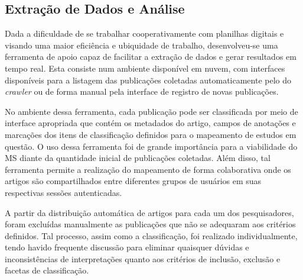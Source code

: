 \subsection{Extração de Dados e Análise}

Dada a dificuldade de se trabalhar cooperativamente com planilhas digitais e visando uma maior eficiência e ubiquidade de trabalho, desenvolveu-se uma ferramenta de apoio capaz de facilitar a extração de dados e gerar resultados em tempo real. Esta consiste num ambiente disponível em nuvem, com interfaces disponíveis para a listagem das publicações coletadas automaticamente pelo do \emph{crawler} ou de forma manual pela interface de registro de novas publicações.

No ambiente dessa ferramenta, cada publicação pode ser classificada por meio de interface apropriada que contém os metadados do artigo, campos de anotações e marcações dos itens de classificação definidos para o mapeamento de estudos em questão. O uso dessa ferramenta foi de grande importância para a viabilidade do MS diante da quantidade inicial de publicações coletadas. Al\'{e}m disso, tal ferramenta permite a realiza\c{c}\~{a}o do mapeamento de forma colaborativa onde os artigos s\~{a}o compartilhados entre diferentes grupos de usuários em suas respectivas sess\~{o}es autenticadas.

A partir da distribuição automática de artigos para cada um dos pesquisadores, foram excluídas manualmente as publicações que não se adequaram aos critérios definidos. Tal processo, assim como a classificação, foi realizado individualmente, tendo havido frequente discussão para eliminar quaisquer dúvidas e inconsistências de interpretações quanto aos critérios de inclusão, exclusão e facetas de classificação. 

